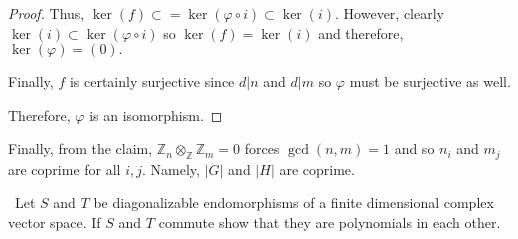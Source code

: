 \documentclass[12pt]{Qual}
\begin{document}
\begin{solution}
\begin{claim}
\begin{proof}
Thus, $\ker(f)\subset=\ker(\varphi\circ i)\subset \ker(i)$. However, clearly $\ker(i)\subset\ker(\varphi\circ i)$ so $\ker(f)=\ker(i)$ and therefore, $\ker(\varphi)=(0).$

Finally, $f$ is certainly surjective since $d|n$ and $d|m$ so $\varphi$ must be surjective as well.

Therefore, $\varphi$ is an isomorphism.
\end{proof}
\end{claim}
\vspace{0.1cm}

Finally, from the claim, $\mathbb{Z}_n\otimes_\mathbb{Z}\mathbb{Z}_m=0$ forces $\gcd(n,m)=1$ and so $n_i$ and $m_j$ are coprime for all $i,j$. Namely, $|G|$ and $|H|$ are coprime.

\end{solution}
\newpage

\begin{problem} $\,$
Let $S$ and $T$ be diagonalizable endomorphisms of a finite dimensional complex vector space. If $S$ and $T$ commute show that they are polynomials in each other.
\end{problem}
\end{document}
